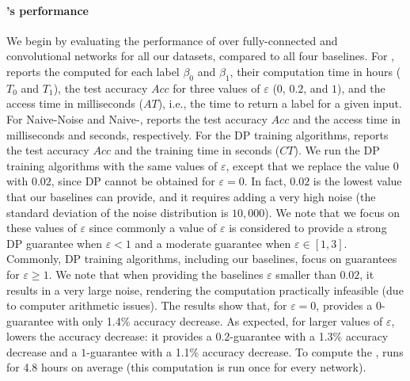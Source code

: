 {\paragraph{\tool's performance}
We begin by evaluating the performance of \tool over fully-connected and convolutional networks for all our datasets, compared to all four baselines.
For \tool,  reports the computed \propa for each label $\beta_0$ and $\beta_1$, their computation time in hours ($T_0$ and $T_1$), 
the test accuracy $Acc$ for three values of $\varepsilon$ ($0$, $0.2$, and $1$), and the access time in milliseconds ($AT$), i.e., the time to return a label for a given input. 
For Naive-Noise and Naive-\propi,  reports the test accuracy $Acc$ and the access time in milliseconds and seconds, respectively. 
For the DP training algorithms,  reports the test accuracy $Acc$ and the training time in seconds ($CT$). 
We run the DP training algorithms with the same values of $\varepsilon$, except that we replace the value $0$ with $0.02$, since DP cannot be obtained for $\varepsilon=0$. In fact, $0.02$ is the lowest value that our baselines can provide, and it requires adding a very high noise (the standard deviation of the noise distribution is $10,000$). 
We note that we focus on these values of $\varepsilon$ since commonly a value of $\varepsilon$ is considered to provide a strong DP guarantee when $\varepsilon<1$ and a moderate guarantee when $\varepsilon \in [1,3]$. 
Commonly, DP training algorithms, including our baselines, focus on guarantees for $\varepsilon\geq 1$.
We note that when providing the baselines $\varepsilon$ smaller than $0.02$, it results in a very large noise, rendering the computation practically infeasible (due to computer arithmetic issues). 
The results show that, for $\varepsilon=0$, \tool provides a $0$-\propi guarantee with only 1.4\% accuracy decrease. As expected, for larger values of $\varepsilon$, \tool lowers the accuracy decrease: it provides a $0.2$-\propi guarantee with a 1.3\% accuracy decrease and a $1$-\propi guarantee with a 1.1\% accuracy decrease.
To compute the \propa, \tool runs for 4.8 hours on average (this computation is run once for every network). %
}

